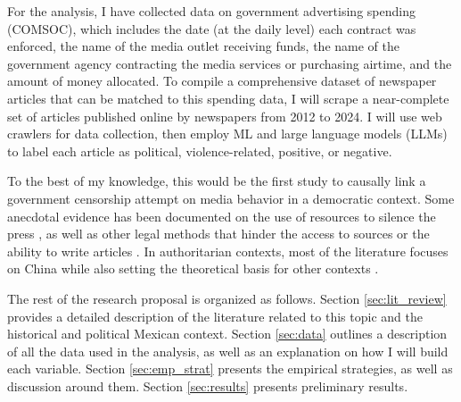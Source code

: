 For the analysis, I have collected data on government advertising spending (COMSOC), which includes the date (at the daily level) each contract was enforced, the name of the media outlet receiving funds, the name of the government agency contracting the media services or purchasing airtime, and the amount of money allocated. To compile a comprehensive dataset of newspaper articles that can be matched to this spending data, I will scrape a near-complete set of articles published online by newspapers from 2012 to 2024. I will use web crawlers for data collection, then employ ML and large language models (LLMs) to label each article as political, violence-related, positive, or negative.

To the best of my knowledge, this would be the first study to causally link a government censorship attempt on media behavior in a democratic context. Some anecdotal evidence has been documented on the use of resources to silence the press \citep{Peru-Macmillan-JEP, ArgCorr-DiTella-AEJAE}, as well as other legal methods that hinder the access to sources or the ability to write articles \citep{Kisha-UoNott, Kisha-Freedom, MexicanPressStanigAJPS}. In authoritarian contexts, most of the literature focuses on China \citep{CensorshipChina-King-Science, CensorshipCollective-King-APSR, Army-Chen-Book, Plus-Anne-PostComm, PersonnelMedia-Lee-IntJPPoli} while also setting the theoretical basis for other contexts \citep{PoorDict-Guriev-APSR, ElitesMedia-Tung-PolComm, Autocracy-Guriev-JPE, Censor-Pratt-AER}.

The rest of the research proposal is organized as follows. Section \ref{sec:lit_review} provides a detailed description of the literature related to this topic and the historical and political Mexican context. Section \ref{sec:data} outlines a description of all the data used in the analysis, as well as an explanation on how I will build each variable. Section \ref{sec:emp_strat} presents the empirical strategies, as well as discussion around them. Section \ref{sec:results} presents preliminary results.

